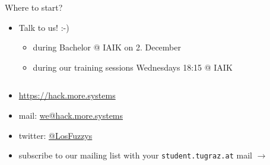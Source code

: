 \begin{frame}[fragile]
	{Where to start?}

	\begin{itemize}
    \item Talk to us! :-)
      \begin{itemize}
        \item during Bachelor @ IAIK on 2. December
        \item during our training sessions Wednesdays 18:15 @ IAIK
      \end{itemize}
  \end{itemize}

  \begin{columns}[T]
    \begin{column}{.6\textwidth}
      \begin{itemize}
        \item \url{https://hack.more.systems}
        \item mail: \href{mailto:we@hack.more.systems}{we@hack.more.systems}
        \item twitter: \href{https://twitter.com/LosFuzzys}{@LosFuzzys}
        \item subscribe to our mailing list with your \texttt{student.tugraz.at} mail \(\rightarrow\)
      \end{itemize}

    \end{column}

    \begin{column}{.4\textwidth}
      \begin{center}
      \end{center}
    \end{column}
  \end{columns}

\end{frame}


